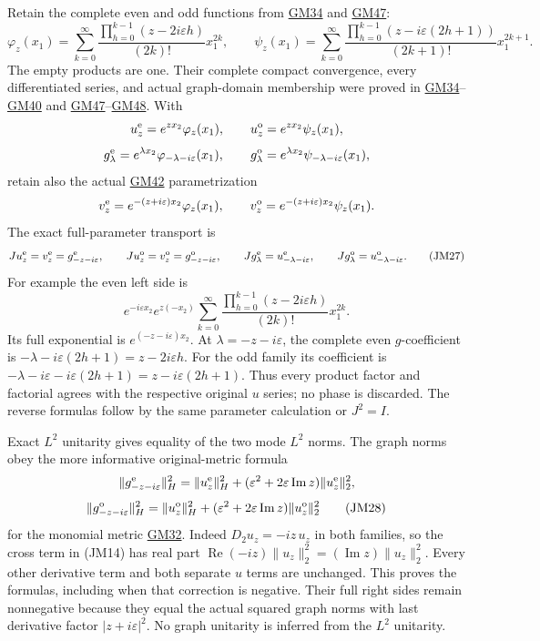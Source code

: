 \documentclass[
  11pt,
]{article}
\begin{document}
Retain the complete even and odd functions from
\href{../u006-graph-domains/graph-domain-note.html\#eq-GM34}{GM34} and
\href{../u006-graph-domains/graph-domain-note.html\#eq-GM47}{GM47}:
\[
 \varphi_z(x_1)=
     \sum_{k=0}^\infty
       \frac{\prod_{h=0}^{k-1}(z-2i\varepsilon h)}{(2k)!}x_1^{2k},
 \qquad
 \psi_z(x_1)=
     \sum_{k=0}^\infty
       \frac{\prod_{h=0}^{k-1}(z-i\varepsilon(2h+1))}{(2k+1)!}x_1^{2k+1}.
\] The empty products are one. Their complete
compact convergence, every differentiated series, and actual
graph-domain membership were proved in
\href{../u006-graph-domains/graph-domain-note.html\#eq-GM34}{GM34}--\href{../u006-graph-domains/graph-domain-note.html\#eq-GM40}{GM40}
and
\href{../u006-graph-domains/graph-domain-note.html\#eq-GM47}{GM47}--\href{../u006-graph-domains/graph-domain-note.html\#eq-GM48}{GM48}.
With \[
 u_z^{\rm e}=e^{zx_2}\varphi_z(x_1),\qquad
 u_z^{\rm o}=e^{zx_2}\psi_z(x_1),
\] \[
 g_\lambda^{\rm e}=e^{\lambda x_2}\varphi_{-\lambda-i\varepsilon}(x_1),\qquad
 g_\lambda^{\rm o}=e^{\lambda x_2}\psi_{-\lambda-i\varepsilon}(x_1),
\] retain also the
actual
\href{../u006-graph-domains/graph-domain-note.html\#eq-GM42}{GM42}
parametrization \[
 v_z^{\rm e}=e^{-(z+i\varepsilon)x_2}\varphi_z(x_1),\qquad
 v_z^{\rm o}=e^{-(z+i\varepsilon)x_2}\psi_z(x_1).
\] The exact full-parameter
transport is \[
 Ju_z^{\rm e}=v_z^{\rm e}=g_{-z-i\varepsilon}^{\rm e},\qquad
 Ju_z^{\rm o}=v_z^{\rm o}=g_{-z-i\varepsilon}^{\rm o},\qquad
 Jg_\lambda^{\rm e}=u_{-\lambda-i\varepsilon}^{\rm e},\qquad
 Jg_\lambda^{\rm o}=u_{-\lambda-i\varepsilon}^{\rm o}.
 \tag{JM27}
\] For example the even left side is
\[
 e^{-i\varepsilon x_2}e^{z(-x_2)}
    \sum_{k=0}^\infty
       \frac{\prod_{h=0}^{k-1}(z-2i\varepsilon h)}{(2k)!}x_1^{2k}.
\] Its full exponential is \(e^{(-z-i\varepsilon)x_2}\).
At \(\lambda=-z-i\varepsilon\), the complete even
\(g\)-coefficient is \(-\lambda-i\varepsilon(2h+1)=z-2i\varepsilon h\). For the
odd family its coefficient is \(-\lambda-i\varepsilon-i\varepsilon(2h+1)
  =z-i\varepsilon(2h+1)\). Thus every
product factor and factorial agrees with the respective original
\(u\) series; no phase is discarded. The reverse
formulas follow by the same parameter calculation or
\(J^2=I\).

Exact \(L^2\) unitarity gives equality of the two mode
\(L^2\) norms. The graph norms obey the more informative
original-metric formula \[
 \|g_{-z-i\varepsilon}^{\rm e}\|_H^2
    =\|u_z^{\rm e}\|_H^2+
             (\varepsilon^2+2\varepsilon\operatorname{Im}z)\|u_z^{\rm e}\|_2^2,
\] \[
 \|g_{-z-i\varepsilon}^{\rm o}\|_H^2
    =\|u_z^{\rm o}\|_H^2+
             (\varepsilon^2+2\varepsilon\operatorname{Im}z)\|u_z^{\rm o}\|_2^2
 \tag{JM28}
\]
for the monomial metric
\href{../u006-graph-domains/graph-domain-note.html\#eq-GM32}{GM32}.
Indeed \(D_2u_z=-iz\,u_z\) in both families, so the cross term in
(JM14) has real part \(\operatorname{Re}(-iz)\|u_z\|_2^2=(\operatorname{Im}z)\|u_z\|_2^2\). Every other derivative
term and both separate \(u\) terms are unchanged. This
proves the formulas, including when that correction is negative. Their
full right sides remain nonnegative because they equal the actual
squared graph norms with last derivative factor \(|z+i\varepsilon|^2\).
No graph unitarity is inferred from the \(L^2\)
unitarity.
\end{document}
